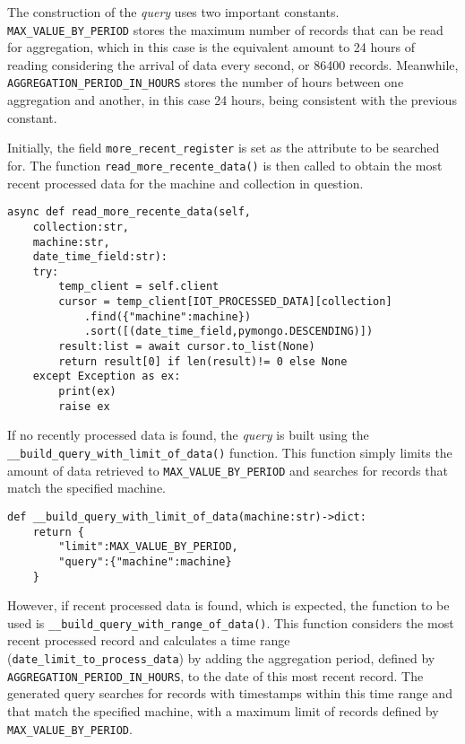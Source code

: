 The construction of the \textit{query} uses two important constants. \texttt{MAX\_VALUE\_BY\_PERIOD} stores the maximum number of records that can be read for aggregation, which in this case is the equivalent amount to 24 hours of reading considering the arrival of data every second, or 86400 records. Meanwhile, \texttt{AGGREGATION\_PERIOD\_IN\_HOURS} stores the number of hours between one aggregation and another, in this case 24 hours, being consistent with the previous constant.

Initially, the field \texttt{more\_recent\_register} is set as the attribute to be searched for. The function \texttt{read\_more\_recente\_data()} is then called to obtain the most recent processed data for the machine and collection in question.

\begin{verbatim}
async def read_more_recente_data(self,
    collection:str,
    machine:str,
    date_time_field:str):
    try:
        temp_client = self.client
        cursor = temp_client[IOT_PROCESSED_DATA][collection]
            .find({"machine":machine})
            .sort([(date_time_field,pymongo.DESCENDING)])
        result:list = await cursor.to_list(None)
        return result[0] if len(result)!= 0 else None
    except Exception as ex:
        print(ex)
        raise ex
\end{verbatim}

If no recently processed data is found, the \textit{query} is built using the \texttt{\_\_build\_query\_with\_limit\_of\_data()} function. This function simply limits the amount of data retrieved to \texttt{MAX\_VALUE\_BY\_PERIOD} and searches for records that match the specified machine.

\begin{verbatim}
def __build_query_with_limit_of_data(machine:str)->dict:
    return {
        "limit":MAX_VALUE_BY_PERIOD,
        "query":{"machine":machine}
    }
\end{verbatim}


However, if recent processed data is found, which is expected, the function to be used is \texttt{\_\_build\_query\_with\_range\_of\_data()}. This function considers the most recent processed record and calculates a time range (\texttt{date\_limit\_to\_process\_data}) by adding the aggregation period, defined by \texttt{AGGREGATION\_PERIOD\_IN\_HOURS}, to the date of this most recent record. The generated query searches for records with timestamps within this time range and that match the specified machine, with a maximum limit of
records defined by \texttt{MAX\_VALUE\_BY\_PERIOD}.

